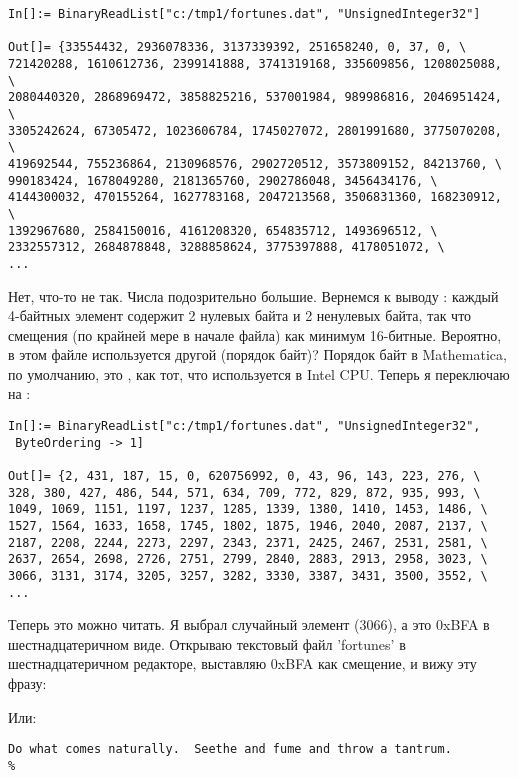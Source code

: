 \begin{lstlisting}[style=custommath]
In[]:= BinaryReadList["c:/tmp1/fortunes.dat", "UnsignedInteger32"]

Out[]= {33554432, 2936078336, 3137339392, 251658240, 0, 37, 0, \
721420288, 1610612736, 2399141888, 3741319168, 335609856, 1208025088, \
2080440320, 2868969472, 3858825216, 537001984, 989986816, 2046951424, \
3305242624, 67305472, 1023606784, 1745027072, 2801991680, 3775070208, \
419692544, 755236864, 2130968576, 2902720512, 3573809152, 84213760, \
990183424, 1678049280, 2181365760, 2902786048, 3456434176, \
4144300032, 470155264, 1627783168, 2047213568, 3506831360, 168230912, \
1392967680, 2584150016, 4161208320, 654835712, 1493696512, \
2332557312, 2684878848, 3288858624, 3775397888, 4178051072, \
...
\end{lstlisting}

Нет, что-то не так. Числа подозрительно большие.
Вернемся к выводу \IT{od}: каждый 4-байтных элемент содержит 2 нулевых байта и 2 ненулевых байта,
так что смещения (по крайней мере в начале файла) как минимум 16-битные.
Вероятно, в этом файле используется другой \IT{endianness} (порядок байт)?
Порядок байт в Mathematica, по умолчанию, это , как тот, что используется в Intel CPU.
Теперь я переключаю на \IT{big-endian}:

\begin{lstlisting}[style=custommath]
In[]:= BinaryReadList["c:/tmp1/fortunes.dat", "UnsignedInteger32", 
 ByteOrdering -> 1]

Out[]= {2, 431, 187, 15, 0, 620756992, 0, 43, 96, 143, 223, 276, \
328, 380, 427, 486, 544, 571, 634, 709, 772, 829, 872, 935, 993, \
1049, 1069, 1151, 1197, 1237, 1285, 1339, 1380, 1410, 1453, 1486, \
1527, 1564, 1633, 1658, 1745, 1802, 1875, 1946, 2040, 2087, 2137, \
2187, 2208, 2244, 2273, 2297, 2343, 2371, 2425, 2467, 2531, 2581, \
2637, 2654, 2698, 2726, 2751, 2799, 2840, 2883, 2913, 2958, 3023, \
3066, 3131, 3174, 3205, 3257, 3282, 3330, 3387, 3431, 3500, 3552, \
...
\end{lstlisting}

Теперь это можно читать.
Я выбрал случайный элемент (3066), а это 0xBFA в шестнадцатеричном виде.
Открываю текстовый файл 'fortunes' в шестнадцатеричном редакторе, выставляю 0xBFA как смещение, и вижу эту фразу:



Или:

\begin{lstlisting}
Do what comes naturally.  Seethe and fume and throw a tantrum.
%
\end{lstlisting}

